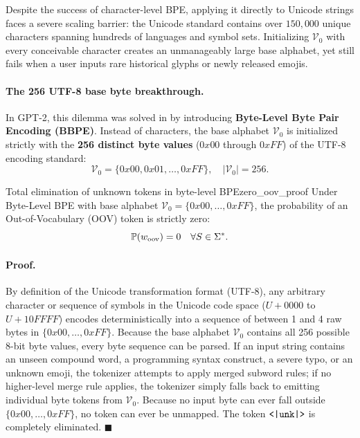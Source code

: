 \documentclass[../../main.tex]{subfiles}
\begin{document}
Despite the success of character-level BPE, applying it directly to Unicode strings faces a severe scaling barrier: the Unicode standard contains over $150{,}000$ unique characters spanning hundreds of languages and symbol sets. Initializing $\mathcal{V}_0$ with every conceivable character creates an unmanageably large base alphabet, yet still fails when a user inputs rare historical glyphs or newly released emojis.

\paragraph{The 256 UTF-8 base byte breakthrough.}
In GPT-2, this dilemma was solved in \cite{radford2019} by introducing \textbf{Byte-Level Byte Pair Encoding (BBPE)}. Instead of characters, the base alphabet $\mathcal{V}_0$ is initialized strictly with the \textbf{256 distinct byte values} ($0x00$ through $0xFF$) of the UTF-8 encoding standard:
\begin{equation}
\label{eq:byte_alphabet}
\mathcal{V}_0 = \{0x00, 0x01, \dots, 0xFF\}, \quad |\mathcal{V}_0| = 256.
\end{equation}

\begin{theorem}{Total elimination of unknown tokens in byte-level BPE}{zero_oov_proof}
Under Byte-Level BPE with base alphabet $\mathcal{V}_0 = \{0x00, \dots, 0xFF\}$, the probability of an Out-of-Vocabulary (OOV) token is strictly zero:
\begin{equation}
\label{eq:zero_oov_guarantee}
\mathbb{P}(w_{\text{oov}}) = 0 \quad \forall S \in \Sigma^*.
\end{equation}
\end{theorem}

\paragraph{Proof.}
By definition of the Unicode transformation format (UTF-8), any arbitrary character or sequence of symbols in the Unicode code space ($U+0000$ to $U+10FFFF$) encodes deterministically into a sequence of between 1 and 4 raw bytes in $\{0x00, \dots, 0xFF\}$.
Because the base alphabet $\mathcal{V}_0$ contains all 256 possible 8-bit byte values, every byte sequence can be parsed. If an input string contains an unseen compound word, a programming syntax construct, a severe typo, or an unknown emoji, the tokenizer attempts to apply merged subword rules; if no higher-level merge rule applies, the tokenizer simply falls back to emitting individual byte tokens from $\mathcal{V}_0$. Because no input byte can ever fall outside $\{0x00, \dots, 0xFF\}$, no token can ever be unmapped. The token $\text{\texttt{<|unk|>}}$ is completely eliminated. $\blacksquare$
\end{document}
